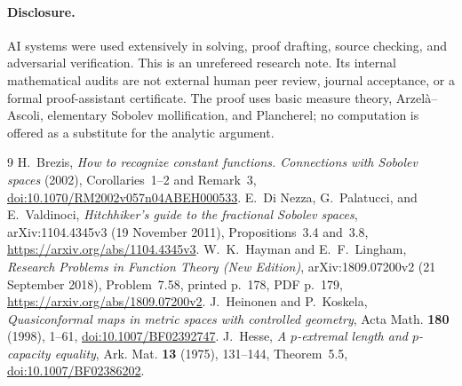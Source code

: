\documentclass[11pt]{article}
\begin{document}
\paragraph{Disclosure.}
AI systems were used extensively in solving, proof drafting, source
checking, and adversarial verification. This is an unrefereed research
note. Its internal mathematical audits are not external human peer review,
journal acceptance, or a formal proof-assistant certificate. The proof
uses basic measure theory, Arzel\`a--Ascoli, elementary Sobolev
mollification, and Plancherel; no computation is offered as a substitute
for the analytic argument.

\begin{thebibliography}{9}
H.~Brezis, \emph{How to recognize constant functions. Connections with
Sobolev spaces} (2002), Corollaries~1--2 and Remark~3,
\href{https://doi.org/10.1070/RM2002v057n04ABEH000533}{doi:10.1070/RM2002v057n04ABEH000533}.
E.~Di Nezza, G.~Palatucci, and E.~Valdinoci,
\emph{Hitchhiker's guide to the fractional Sobolev spaces},
arXiv:1104.4345v3 (19 November 2011), Propositions~3.4 and~3.8,
\url{https://arxiv.org/abs/1104.4345v3}.
W.~K.~Hayman and E.~F.~Lingham,
\emph{Research Problems in Function Theory (New Edition)},
arXiv:1809.07200v2 (21 September 2018), Problem~7.58,
printed p.~178, PDF p.~179,
\url{https://arxiv.org/abs/1809.07200v2}.
J.~Heinonen and P.~Koskela,
\emph{Quasiconformal maps in metric spaces with controlled geometry},
Acta Math. \textbf{180} (1998), 1--61,
\href{https://doi.org/10.1007/BF02392747}{doi:10.1007/BF02392747}.
J.~Hesse, \emph{A $p$-extremal length and $p$-capacity equality},
Ark. Mat. \textbf{13} (1975), 131--144, Theorem~5.5,
\href{https://doi.org/10.1007/BF02386202}{doi:10.1007/BF02386202}.
\end{thebibliography}
\end{document}
